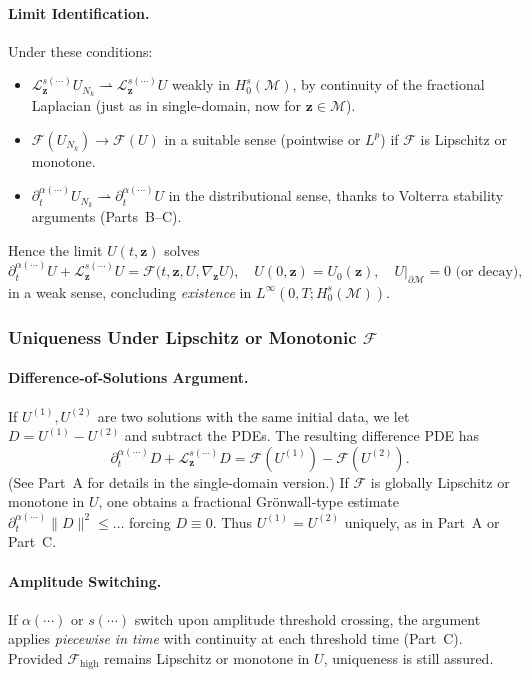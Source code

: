 \documentclass[12pt]{article}
\begin{document}
\paragraph{Limit Identification.}
Under these conditions:
\begin{itemize}
    \item $\mathcal{L}_{\mathbf{z}}^{s(\cdots)}U_{N_k} \rightharpoonup \mathcal{L}_{\mathbf{z}}^{s(\cdots)}U$ 
          weakly in $H_0^s(\mathcal{M})$, by continuity of the fractional Laplacian 
          (just as in single-domain, now for $\mathbf{z}\in \mathcal{M}$).
    \item $\mathcal{F}(U_{N_k}) \to \mathcal{F}(U)$ in a suitable sense 
          (pointwise or $L^p$) if $\mathcal{F}$ is Lipschitz or monotone. 
    \item $\partial_t^{\alpha(\cdots)} U_{N_k} \rightharpoonup \partial_t^{\alpha(\cdots)} U$ 
          in the distributional sense, thanks to Volterra stability arguments (Parts~B--C).
\end{itemize}
Hence the limit $U(t,\mathbf{z})$ solves
\[
\partial_t^{\alpha(\cdots)} U
+ 
\mathcal{L}_{\mathbf{z}}^{s(\cdots)} U
=
\mathcal{F}\bigl(t,\mathbf{z},U,\nabla_{\mathbf{z}}U\bigr),
\quad
U(0,\mathbf{z})=U_0(\mathbf{z}),
\quad
U|_{\partial\mathcal{M}}=0 \text{ (or decay)},
\]
in a weak sense, concluding \emph{existence} in $L^\infty(0,T;H_0^s(\mathcal{M}))$.

\subsubsection{Uniqueness Under Lipschitz or Monotonic \texorpdfstring{\(\mathcal{F}\)}{}}

\paragraph{Difference‐of‐Solutions Argument.}
If $U^{(1)},U^{(2)}$ are two solutions with the same initial data, we let 
$D=U^{(1)}-U^{(2)}$ and subtract the PDEs. The resulting difference PDE has 
\[
\partial_t^{\alpha(\cdots)} D
+ 
\mathcal{L}_{\mathbf{z}}^{s(\cdots)} D
=
\mathcal{F}(U^{(1)}) - \mathcal{F}(U^{(2)}).
\]
(See Part~A for details in the single-domain version.) If $\mathcal{F}$ is globally 
Lipschitz or monotone in $U$, one obtains a fractional Grönwall‐type estimate 
$\partial_t^{\alpha(\cdots)} \|D\|^2 \le \dots$ forcing $D\equiv 0$. Thus 
$U^{(1)}=U^{(2)}$ uniquely, as in Part~A or Part~C. 

\paragraph{Amplitude Switching.}
If $\alpha(\cdots)$ or $s(\cdots)$ switch upon amplitude threshold crossing, the argument 
applies \emph{piecewise in time} with continuity at each threshold time (Part~C). Provided 
$\mathcal{F}_{\mathrm{high}}$ remains Lipschitz or monotone in $U$, uniqueness is still 
assured.
\end{document}
